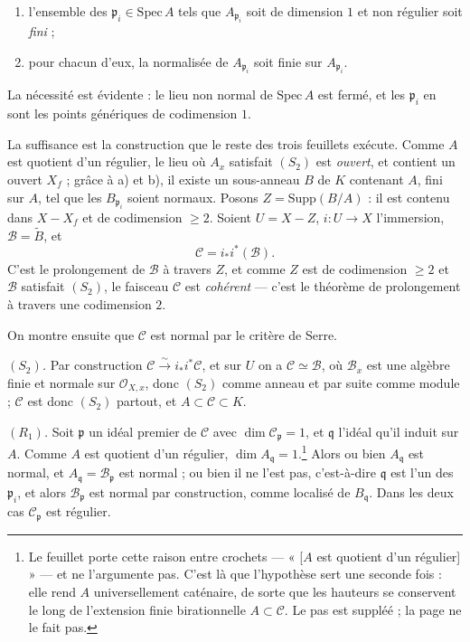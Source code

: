 \documentclass[11pt,a4paper]{article}
\begin{document}
\begin{enumerate}
  \item[a)] l'ensemble des $\mathfrak{p}_{i} \in \mathrm{Spec}\,A$ tels que
  $A_{\mathfrak{p}_{i}}$ soit de dimension $1$ et non régulier soit \emph{fini} ;
  \item[b)] pour chacun d'eux, la normalisée de $A_{\mathfrak{p}_{i}}$ soit
  finie sur $A_{\mathfrak{p}_{i}}$.
\end{enumerate}

La nécessité est évidente : le lieu non normal de $\mathrm{Spec}\,A$ est fermé,
et les $\mathfrak{p}_{i}$ en sont les points génériques de codimension $1$.

La suffisance est la construction que le reste des trois feuillets exécute.
Comme $A$ est quotient d'un régulier, le lieu où $A_{x}$ satisfait $(S_{2})$ est
\emph{ouvert}, et contient un ouvert $X_{f}$ ; grâce à a) et b), il existe un
sous-anneau $B$ de $K$ contenant $A$, fini sur $A$, tel que les
$B_{\mathfrak{p}_{i}}$ soient normaux. Posons $Z = \mathrm{Supp}(B/A)$ : il est
contenu dans $X - X_{f}$ et de codimension $\geqslant 2$. Soient $U = X - Z$,
$i : U \to X$ l'immersion, $\mathcal{B} = \widetilde{B}$, et
\[
  \mathcal{C} = i_{*} i^{*}(\mathcal{B}) .
\]
C'est le prolongement de $\mathcal{B}$ à travers $Z$, et comme $Z$ est de
codimension $\geqslant 2$ et $\mathcal{B}$ satisfait $(S_{2})$, le faisceau
$\mathcal{C}$ est \emph{cohérent} — c'est le théorème de prolongement à travers
une codimension $2$.

On montre ensuite que $\mathcal{C}$ est normal par le critère de Serre.

\emph{$(S_{2})$.} Par construction $\mathcal{C} \xrightarrow{\sim} i_{*}i^{*}
\mathcal{C}$, et sur $U$ on a $\mathcal{C} \simeq \mathcal{B}$, où
$\mathcal{B}_{x}$ est une algèbre finie et normale sur $\mathcal{O}_{X,x}$, donc
$(S_{2})$ comme anneau et par suite comme module ; $\mathcal{C}$ est donc
$(S_{2})$ partout, et $A \subset \mathcal{C} \subset K$.

\emph{$(R_{1})$.} Soit $\mathfrak{p}$ un idéal premier de $\mathcal{C}$ avec
$\dim \mathcal{C}_{\mathfrak{p}} = 1$, et $\mathfrak{q}$ l'idéal qu'il induit sur
$A$. Comme $A$ est quotient d'un régulier, $\dim A_{\mathfrak{q}} = 1$.\footnote{Le
feuillet porte cette raison entre crochets — « [$A$ est quotient d'un
régulier] » — et ne l'argumente pas. C'est là que l'hypothèse sert une seconde
fois : elle rend $A$ universellement caténaire, de sorte que les hauteurs se
conservent le long de l'extension finie birationnelle $A \subset \mathcal{C}$.
Le pas est suppléé ; la page ne le fait pas.} Alors ou bien
$A_{\mathfrak{q}}$ est normal, et $A_{\mathfrak{q}} = \mathcal{B}_{\mathfrak{p}}$
est normal ; ou bien il ne l'est pas, c'est-à-dire $\mathfrak{q}$ est l'un des
$\mathfrak{p}_{i}$, et alors $\mathcal{B}_{\mathfrak{p}}$ est normal par
construction, comme localisé de $B_{\mathfrak{q}}$. Dans les deux cas
$\mathcal{C}_{\mathfrak{p}}$ est régulier.
\end{document}
